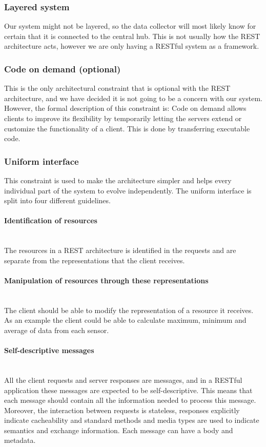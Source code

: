 \documentclass[../document.tex]{subfiles}
\begin{document}
\subsubsection{Layered system}
Our system might not be layered, so the data collector will most likely know for certain that it is connected to the central hub. This is not usually how the REST architecture acts, however we are only having a RESTful system as a framework. 

\subsubsection{Code on demand (optional)}
This is the only architectural constraint that is optional with the REST architecture, and we have decided it is not going to be a concern with our system. However, the formal description of this constraint is: Code on demand allows clients to improve its flexibility by temporarily letting the servers extend or customize the functionality of a client. This is done by transferring executable code.

\subsubsection{Uniform interface}
This constraint is used to make the architecture simpler and helps every individual part of the system to evolve independently. The uniform interface is split into four different guidelines.

\paragraph{Identification of resources} \ \\
The resources in a REST architecture is identified in the requests and are separate from the representations that the client receives. 

\paragraph{Manipulation of resources through these representations} \ \\
The client should be able to modify the representation of a resource it receives. As an example the client could be able to calculate maximum, minimum and average of data from each sensor. 

\paragraph{Self-descriptive messages} \ \\
All the client requests and server responses are messages, and in a RESTful application these messages are expected to be self-descriptive. This means that each message should contain all the information needed to process this message. Moreover, the interaction between requests is stateless, responses explicitly indicate cacheability and standard methods and media types are used to indicate semantics and exchange information. Each message can have a body and metadata.
\end{document}
